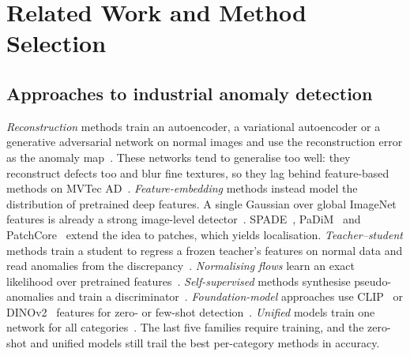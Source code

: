 \section{Related Work and Method Selection}
\label{sec:related}

\subsection{Approaches to industrial anomaly detection}
\emph{Reconstruction} methods train an autoencoder, a variational autoencoder or a generative adversarial network on normal images and use the reconstruction error as the anomaly map~\cite{bergmann2019ssim,akcay2018ganomaly,kingma2014vae}.
These networks tend to generalise too well: they reconstruct defects too and blur fine textures, so they lag behind feature-based methods on MVTec AD~\cite{bergmann2021mvtec}.
\emph{Feature-embedding} methods instead model the distribution of pretrained deep features.
A single Gaussian over global ImageNet features is already a strong image-level detector~\cite{rippel2020gaussian}.
SPADE~\cite{cohen2020spade}, PaDiM~\cite{defard2021padim} and PatchCore~\cite{roth2022patchcore} extend the idea to patches, which yields localisation.
\emph{Teacher--student} methods train a student to regress a frozen teacher's features on normal data and read anomalies from the discrepancy~\cite{bergmann2020students,wang2021stfpm,deng2022rd4ad,batzner2024efficientad}.
\emph{Normalising flows} learn an exact likelihood over pretrained features~\cite{rudolph2021differnet,gudovskiy2022cflow,yu2021fastflow}.
\emph{Self-supervised} methods synthesise pseudo-anomalies and train a discriminator~\cite{li2021cutpaste,zavrtanik2021draem,liu2023simplenet}.
\emph{Foundation-model} approaches use CLIP~\cite{radford2021clip} or DINOv2~\cite{oquab2024dinov2} features for zero- or few-shot detection~\cite{jeong2023winclip,damm2025anomalydino}.
\emph{Unified} models train one network for all categories~\cite{you2022uniad}.
The last five families require training, and the zero-shot and unified models still trail the best per-category methods in accuracy.


